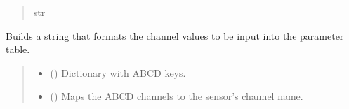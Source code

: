 \documentclass[letterpaper,10pt,english]{sphinxmanual}
\begin{document}
\begin{fulllineitems}
\begin{fulllineitems}
\begin{quote}
\begin{description}
\sphinxAtStartPar
str

\end{description}\end{quote}

\end{fulllineitems}


\begin{fulllineitems}
\label{\detokenize{Setup.SetupOneDevice:Setup.SetupOneDevice.Setup_8401HR.Setup8401HR._NiceABCDtableText}}
\pysigstartsignatures
{}
\pysigstopsignatures
\sphinxAtStartPar
Builds a string that formats the channel values to be input into the parameter table.
\begin{quote}\begin{description}
\begin{itemize}
\item {} 
\sphinxAtStartPar
{} (\sphinxstyleliteralemphasis{\sphinxupquote{{[}}}\sphinxstyleliteralemphasis{\sphinxupquote{,}}\sphinxstyleliteralemphasis{\sphinxupquote{ | }}\sphinxstyleliteralemphasis{\sphinxupquote{ | }}\sphinxstyleliteralemphasis{\sphinxupquote{{]}}}) \textendash{} Dictionary with ABCD keys.

\item {} 
\sphinxAtStartPar
{} (\sphinxstyleliteralemphasis{\sphinxupquote{{[}}}\sphinxstyleliteralemphasis{\sphinxupquote{,}}\sphinxstyleliteralemphasis{\sphinxupquote{{]}}}) \textendash{} Maps the ABCD channels to the sensor’s channel name.


\end{itemize}
\end{description}
\end{quote}
\end{fulllineitems}
\end{fulllineitems}
\end{document}
